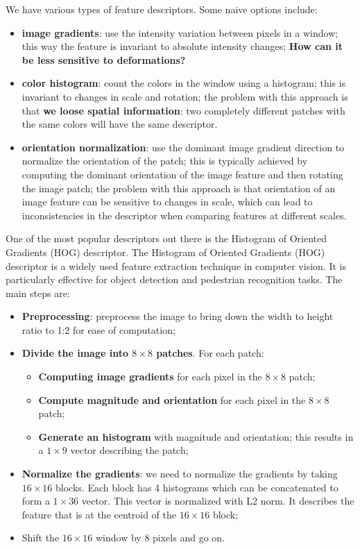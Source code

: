 \documentclass{article}
\begin{document}
We have various types of feature descriptors. Some naive options include:

\begin{itemize}
    \item \textbf{image gradients}: use the intensity variation between pixels in a window; this way the feature is invariant to absolute intensity changes; \textbf{How can it be less sensitive to deformations?}
    \item \textbf{color histogram}: count the colors in the window using a histogram; this is invariant to changes in scale and rotation; the problem with this approach is that \textbf{we loose spatial information}: two completely different patches with the same colors will have the same descriptor.
    \item \textbf{orientation normalization}: use the dominant image gradient direction to normalize the orientation of the patch; this is typically achieved by computing the dominant orientation of the image feature and then rotating the image patch; the problem with this approach is that orientation of an image feature can be sensitive to changes in scale, which can lead to inconsistencies in the descriptor when comparing features at different scales.
\end{itemize}

One of the most popular descriptors out there is the Histogram of Oriented Gradients (HOG) descriptor. The Histogram of Oriented Gradients (HOG) descriptor is a widely used feature extraction technique in computer vision. It is particularly effective for object detection and pedestrian recognition tasks. The main steps are:

\begin{itemize}
    \item \textbf{Preprocessing}: preprocess the image to bring down the width to height ratio to 1:2 for ease of computation;
    \item \textbf{Divide the image into $8 \times 8$ patches}. For each patch:
    \begin{itemize}
        \item \textbf{Computing image gradients} for each pixel in the $8 \times 8$ patch;
        \item \textbf{Compute magnitude and orientation} for each pixel in the $8 \times 8$ patch;
        \item \textbf{Generate an histogram} with magnitude and orientation; this results in a $1 \times 9$ vector describing the patch;
    \end{itemize}
    \item \textbf{Normalize the gradients}: we need to normalize the gradients by taking $16 \times 16$ blocks. Each block has 4 histograms which can be concatenated to form a $1 \times 36$ vector.
    This vector is normalized with L2 norm. It describes the feature that is at the centroid of the $16 \times 16$ block;
    \item Shift the $16 \times 16$ window by 8 pixels and go on. 
\end{itemize}
\end{document}
